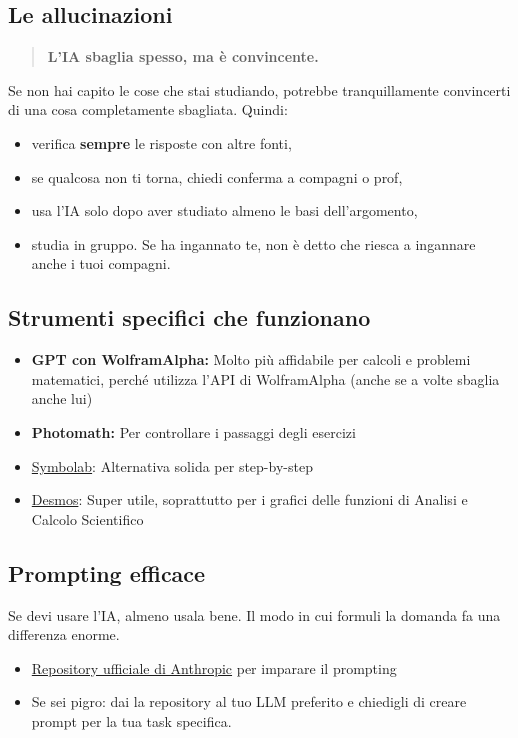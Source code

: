 \documentclass[18pt]{extarticle}
\begin{document}
\subsection{Le allucinazioni}
\begin{quote}
\textbf{L'IA sbaglia spesso, ma è convincente.}
\end{quote}
Se non hai capito le cose che stai studiando, potrebbe tranquillamente convincerti di una cosa completamente sbagliata. Quindi:
\begin{itemize}
\item verifica \textbf{sempre} le risposte con altre fonti,
\item se qualcosa non ti torna, chiedi conferma a compagni o prof,
\item usa l'IA solo dopo aver studiato almeno le basi dell'argomento,
\item studia in gruppo. Se ha ingannato te, non è detto che riesca a ingannare anche i tuoi compagni.
\end{itemize}


\subsection{Strumenti specifici che funzionano}
\begin{itemize}
\item \textbf{GPT con WolframAlpha:} Molto più affidabile per calcoli e problemi matematici, perché utilizza l'API di WolframAlpha (anche se a volte sbaglia anche lui)
\item \textbf{Photomath:} Per controllare i passaggi degli esercizi
\item \href{https://it.symbolab.com/}{Symbolab}: Alternativa solida per step-by-step
\item \href{https://www.desmos.com/calculator?lang=it}{Desmos}: Super utile, soprattutto per i grafici delle funzioni di Analisi e Calcolo Scientifico
\end{itemize}


\subsection{Prompting efficace}
Se devi usare l'IA, almeno usala bene. Il modo in cui formuli la domanda fa una differenza enorme.
\begin{itemize}
\item \href{https://github.com/anthropics/prompt-eng-interactive-tutorial}{Repository ufficiale di Anthropic} per imparare il prompting
\item Se sei pigro: dai la repository al tuo LLM preferito e chiedigli di creare prompt per la tua task specifica.
\end{itemize}
\end{document}
